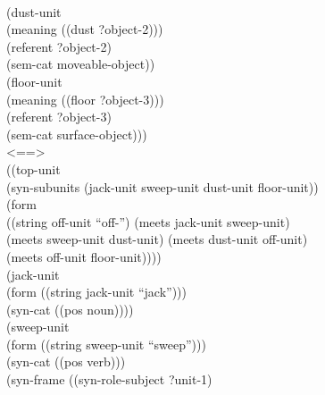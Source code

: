 {{\\ \hspace*{2mm}(dust-unit
\\ \hspace*{5mm} (meaning ((dust ?object-2)))
\\ \hspace*{5mm} (referent ?object-2)
\\ \hspace*{5mm} (sem-cat moveable-object))
\\ \hspace*{2mm}(floor-unit
\\ \hspace*{5mm} (meaning ((floor ?object-3)))
\\ \hspace*{5mm} (referent ?object-3)
\\ \hspace*{5mm} (sem-cat surface-object)))
\\ <==>
\\ ((top-unit
\\ \hspace*{5mm} (syn-subunits (jack-unit sweep-unit dust-unit floor-unit))
\\ \hspace*{5mm} (form 
\\ \hspace*{10mm}((string off-unit ``off-'') (meets jack-unit sweep-unit)
\\ \hspace*{11mm} (meets sweep-unit dust-unit) (meets dust-unit off-unit)  
\\ \hspace*{11mm} (meets off-unit floor-unit))))
\\ \hspace*{2mm}(jack-unit
\\ \hspace*{5mm} (form ((string jack-unit ``jack'')))
\\ \hspace*{5mm} (syn-cat ((pos noun))))
\\ \hspace*{2mm}(sweep-unit
\\ \hspace*{5mm} (form ((string sweep-unit ``sweep'')))
\\ \hspace*{5mm} (syn-cat ((pos verb)))
\\ \hspace*{5mm} (syn-frame ((syn-role-subject ?unit-1)
}}
